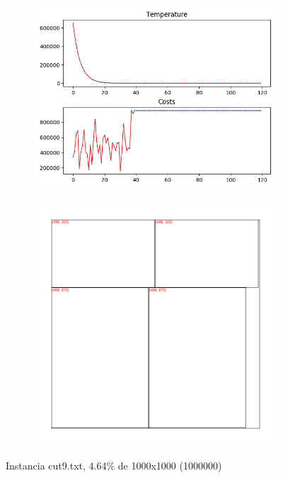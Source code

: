 \begin{figure}
\centering
\begin{subfigure}{.5\textwidth}
  \centering
  \includegraphics[width=1\linewidth]{results/cut9/1/plot}
  \label{fig:sub1}
\end{subfigure}%
\begin{subfigure}{.5\textwidth}
  \centering
  \includegraphics[width=1\linewidth]{results/cut9/1/cut}
  \label{fig:sub2}
\end{subfigure}
\caption{Instancia cut9.txt, 4.64\% de 1000x1000 (1000000)}
\label{fig:test}
\end{figure}

